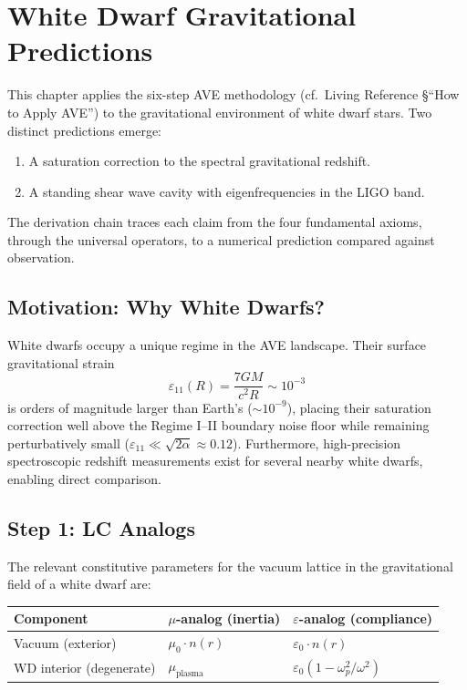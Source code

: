 \chapter{White Dwarf Gravitational Predictions}
\label{ch:white_dwarf_predictions}

This chapter applies the six-step AVE methodology (cf.\ Living Reference \S``How to Apply AVE'')
to the gravitational environment of white dwarf stars.  Two distinct predictions emerge:
\begin{enumerate}
    \item A saturation correction to the spectral gravitational redshift.
    \item A standing shear wave cavity with eigenfrequencies in the LIGO band.
\end{enumerate}
The derivation chain traces each claim from the four fundamental axioms,
through the universal operators, to a numerical prediction compared against observation.

\section{Motivation: Why White Dwarfs?}

White dwarfs occupy a unique regime in the AVE landscape.
Their surface gravitational strain
\begin{equation}
    \varepsilon_{11}(R) = \frac{7GM}{c^2 R} \sim 10^{-3}
\end{equation}
is orders of magnitude larger than Earth's ($\sim 10^{-9}$),
placing their saturation correction well above the Regime I--II boundary noise floor
while remaining perturbatively small ($\varepsilon_{11} \ll \sqrt{2\alpha} \approx 0.12$).
Furthermore, high-precision spectroscopic redshift measurements exist
for several nearby white dwarfs, enabling direct comparison.

\section{Step 1: LC Analogs}

The relevant constitutive parameters for the vacuum lattice
in the gravitational field of a white dwarf are:

\begin{center}
\begin{tabular}{lll}
\toprule
\textbf{Component} & \textbf{$\mu$-analog (inertia)} & \textbf{$\varepsilon$-analog (compliance)} \\
\midrule
Vacuum (exterior) & $\mu_0 \cdot n(r)$ & $\varepsilon_0 \cdot n(r)$ \\
WD interior (degenerate) & $\mu_{\text{plasma}}$ & $\varepsilon_0(1 - \omega_p^2 / \omega^2)$ \\
\bottomrule
\end{tabular}
\end{center}

